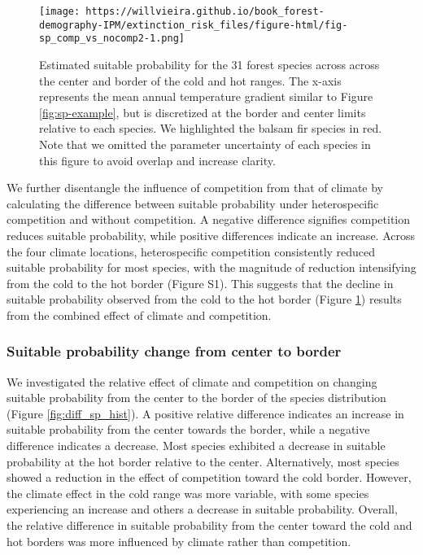 \documentclass[12pt]{article}
\begin{document}
\begin{figure}
\hypertarget{fig:sp_comp_vs_nocomp2}{%
\centering
\texttt{[image: https://willvieira.github.io/book\_forest-demography-IPM/extinction\_risk\_files/figure-html/fig-sp\_comp\_vs\_nocomp2-1.png]}
\caption{Estimated suitable probability for the 31 forest species across
across the center and border of the cold and hot ranges. The x-axis
represents the mean annual temperature gradient similar to Figure
\ref{fig:sp-example}, but is discretized at the border and center limits
relative to each species. We highlighted the balsam fir species in red.
Note that we omitted the parameter uncertainty of each species in this
figure to avoid overlap and increase
clarity.}\label{fig:sp_comp_vs_nocomp2}
}
\end{figure}

We further disentangle the influence of competition from that of climate
by calculating the difference between suitable probability under
heterospecific competition and without competition. A negative
difference signifies competition reduces suitable probability, while
positive differences indicate an increase. Across the four climate
locations, heterospecific competition consistently reduced suitable
probability for most species, with the magnitude of reduction
intensifying from the cold to the hot border (Figure S1). This suggests
that the decline in suitable probability observed from the cold to the
hot border (Figure \ref{fig:sp_comp_vs_nocomp2}) results from the
combined effect of climate and competition.

\hypertarget{suitable-probability-change-from-center-to-border}{%
\subsubsection{Suitable probability change from center to
border}\label{suitable-probability-change-from-center-to-border}}

We investigated the relative effect of climate and competition on
changing suitable probability from the center to the border of the
species distribution (Figure \ref{fig:diff_sp_hist}). A positive
relative difference indicates an increase in suitable probability from
the center towards the border, while a negative difference indicates a
decrease. Most species exhibited a decrease in suitable probability at
the hot border relative to the center. Alternatively, most species
showed a reduction in the effect of competition toward the cold border.
However, the climate effect in the cold range was more variable, with
some species experiencing an increase and others a decrease in suitable
probability. Overall, the relative difference in suitable probability
from the center toward the cold and hot borders was more influenced by
climate rather than competition.
\end{document}
